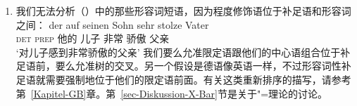 \begin{enumerate}
\item 我们无法分析（）中的那些形容词短语，因为程度修饰语位于补足语和形容词之间：
\ea
\gll der auf seinen Sohn sehr stolze Vater\\
	 \textsc{det} \textsc{prep} 他的 儿子 非常 骄傲 父亲\\
\glt `对儿子感到非常骄傲的父亲'
\z
我们要么允准限定语跟他们的中心语组合位于补足语前，要么允准树的交叉。另一个假设是德语像英语一样，不过形容词性补足语就需要强制地位于他们的限定语前面。有关这类重新排序的描写，请参考第~\ref{Kapitel-GB}章。第~\ref{sec-Diskussion-X-Bar}节是关于\xbar "=理论的讨论。


\end{enumerate}
